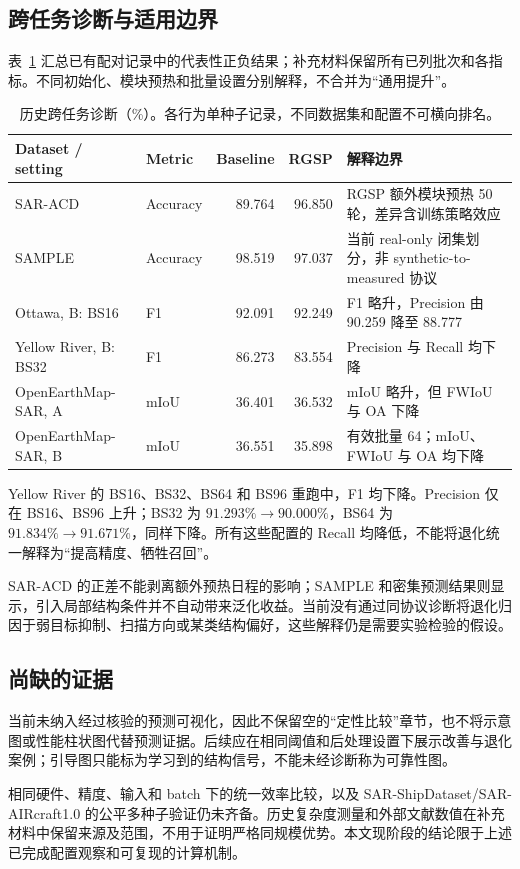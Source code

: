 \subsection{跨任务诊断与适用边界}
表~\ref{tab:cross_task_summary} 汇总已有配对记录中的代表性正负结果；补充材料保留所有已列批次和各指标。不同初始化、模块预热和批量设置分别解释，不合并为“通用提升”。

\begin{table}[!t]
\centering\small
\setlength{\tabcolsep}{4pt}
\caption{历史跨任务诊断（\%）。各行为单种子记录，不同数据集和配置不可横向排名。}
\label{tab:cross_task_summary}
\begin{tabularx}{\linewidth}{@{}llrrX@{}}
\toprule
Dataset / setting & Metric & Baseline & RGSP & 解释边界\\
\midrule
SAR-ACD & Accuracy & 89.764 & 96.850 & RGSP 额外模块预热 50 轮，差异含训练策略效应\\
SAMPLE & Accuracy & 98.519 & 97.037 & 当前 real-only 闭集划分，非 synthetic-to-measured 协议\\
Ottawa, B: BS16 & F1 & 92.091 & 92.249 & F1 略升，Precision 由 90.259 降至 88.777\\
Yellow River, B: BS32 & F1 & 86.273 & 83.554 & Precision 与 Recall 均下降\\
OpenEarthMap-SAR, A & mIoU & 36.401 & 36.532 & mIoU 略升，但 FWIoU 与 OA 下降\\
OpenEarthMap-SAR, B & mIoU & 36.551 & 35.898 & 有效批量 64；mIoU、FWIoU 与 OA 均下降\\
\bottomrule
\end{tabularx}
\end{table}

Yellow River 的 BS16、BS32、BS64 和 BS96 重跑中，F1 均下降。Precision 仅在 BS16、BS96 上升；BS32 为 $91.293\%\to90.000\%$，BS64 为 $91.834\%\to91.671\%$，同样下降。所有这些配置的 Recall 均降低，不能将退化统一解释为“提高精度、牺牲召回”。

SAR-ACD 的正差不能剥离额外预热日程的影响；SAMPLE 和密集预测结果则显示，引入局部结构条件并不自动带来泛化收益。当前没有通过同协议诊断将退化归因于弱目标抑制、扫描方向或某类结构偏好，这些解释仍是需要实验检验的假设。

\subsection{尚缺的证据}
当前未纳入经过核验的预测可视化，因此不保留空的“定性比较”章节，也不将示意图或性能柱状图代替预测证据。后续应在相同阈值和后处理设置下展示改善与退化案例；引导图只能标为学习到的结构信号，不能未经诊断称为可靠性图。

相同硬件、精度、输入和 batch 下的统一效率比较，以及 SAR-ShipDataset/SAR-AIRcraft1.0 的公平多种子验证仍未齐备。历史复杂度测量和外部文献数值在补充材料中保留来源及范围，不用于证明严格同规模优势。本文现阶段的结论限于上述已完成配置观察和可复现的计算机制。

